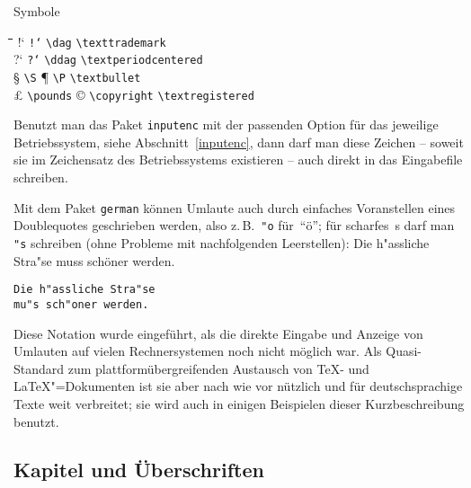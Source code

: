 \begin{table}[tbp]
  \caption{Symbole} \label{specials}
   \begin{tabbing}
   \hspace{1cm}\=\hspace{3.15cm}\=  \hspace{1cm}\=\hspace{3.15cm}\=
   \hspace{1cm}\=\hspace{3.5cm}\=  \kill
!` \> \texttt{!{}`}      \> \dag \> \verb|\dag|            \> \texttrademark  \> \verb|\texttrademark|   \\         
?` \> \texttt{?{}`}      \> \ddag \> \verb|\ddag|          \> \textperiodcentered \> \verb|\textperiodcentered| \\ 
\S \> \verb|\S|          \> \P \> \verb|\P|                \> \textbullet    \> \verb|\textbullet| \\              
\pounds\> \verb|\pounds| \> \copyright \> \verb|\copyright|\>\textregistered  \> \verb|\textregistered| \\ 
   \end{tabbing}
\end{table}


Benutzt man das Paket \texttt{inputenc} mit der passenden Option
für das jeweilige Betriebssystem, siehe Abschnitt~\ref{inputenc},
dann darf man diese Zeichen -- soweit sie im Zeichensatz des Betriebssystems
existieren -- auch direkt in das Eingabefile schreiben.

Mit dem Paket \texttt{german} %
können
Umlaute auch durch einfaches Voranstellen eines Doublequotes geschrieben werden, 
also z.\,B.\ \verb|"o| für~"`ö"';
für scharfes~s darf man \verb|"s| schreiben (ohne Probleme mit
nachfolgenden Leerstellen):
\exa
Die h"assliche Stra"se
muss schöner werden.
\exb
\begin{verbatim}
Die h"assliche Stra"se
mu"s sch"oner werden.
\end{verbatim}
\exc
Diese Notation wurde eingeführt, als die direkte Eingabe und
Anzeige von Umlauten auf vielen Rechnersystemen noch nicht möglich war.
Als Quasi-Standard zum plattformübergreifenden Austausch von 
\TeX- und \LaTeX"=Dokumenten ist sie aber nach wie vor nützlich und
für deutschsprachige Texte weit verbreitet; sie wird auch in einigen 
Beispielen dieser Kurzbeschreibung benutzt.
 


\subsection{Kapitel und Überschriften}
 
